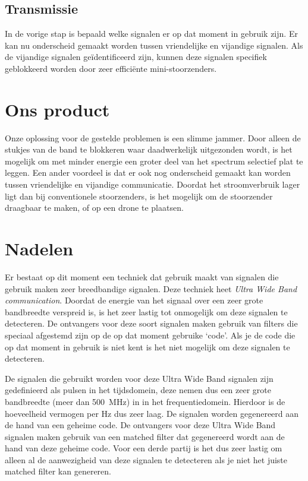 \documentclass[oneside, a4paper, openany]{memoir}
\begin{document}
\subsection{Transmissie}
In de vorige stap is bepaald welke signalen er op dat moment in gebruik zijn. Er kan nu onderscheid gemaakt worden tussen vriendelijke en vijandige signalen. Als de vijandige signalen geïdentificeerd zijn, kunnen deze signalen specifiek geblokkeerd worden door zeer efficiënte mini-stoorzenders.

\section{Ons product}
Onze oplossing voor de gestelde problemen is een slimme jammer. Door alleen de stukjes van de band te blokkeren waar daadwerkelijk uitgezonden wordt, is het mogelijk om met minder energie een groter deel van het spectrum selectief plat te leggen. Een ander voordeel is dat er ook nog onderscheid gemaakt kan worden tussen vriendelijke en vijandige communicatie. Doordat het stroomverbruik lager ligt dan bij conventionele stoorzenders, is het mogelijk om de stoorzender draagbaar te maken, of op een drone te plaatsen.

\section{Nadelen}
Er bestaat op dit moment een techniek dat gebruik maakt van signalen die gebruik maken zeer breedbandige signalen. Deze techniek heet \textit{Ultra Wide Band communication}. Doordat de energie van het signaal over een zeer grote bandbreedte verspreid is, is het zeer lastig tot onmogelijk om deze signalen te detecteren. De ontvangers voor deze soort signalen maken gebruik van filters die speciaal afgestemd zijn op de op dat moment gebruike `code'. Als je de code die op dat moment in gebruik is niet kent is het niet mogelijk om deze signalen te detecteren.

\begin{blockDetail}
De signalen die gebruikt worden voor deze Ultra Wide Band signalen zijn gedefinieerd als pulsen in het tijdsdomein, deze nemen dus een zeer grote bandbreedte (meer dan \SI{500}{\mega\hertz}) in in het frequentiedomein. Hierdoor is de hoeveelheid vermogen per \si{\hertz} dus zeer laag. De signalen worden gegenereerd aan de hand van een geheime code. De ontvangers voor deze Ultra Wide Band signalen maken gebruik van een matched filter dat gegenereerd wordt aan de hand van deze geheime code. Voor een derde partij is het dus zeer lastig om alleen al de aanwezigheid van deze signalen te detecteren als je niet het juiste matched filter kan genereren.
\end{blockDetail}
\end{document}
